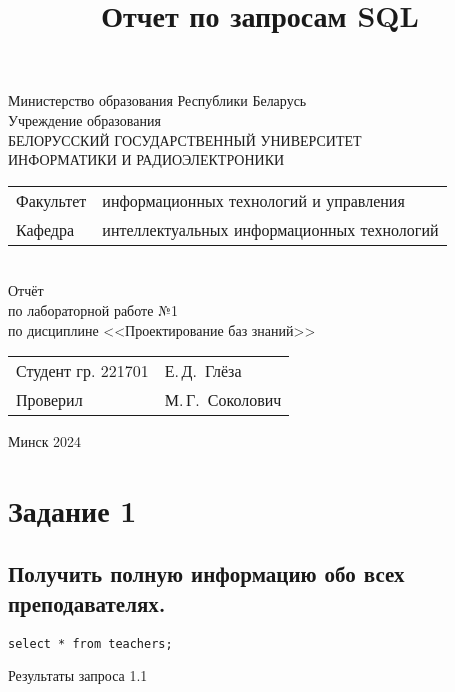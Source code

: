 \documentclass[a4paper,8pt]{article}
\title{Отчет по запросам SQL}
\author{}
\date{}
\begin{document}
\begin{titlepage}
  \begin{center}
    Министерство образования Республики Беларусь\\[1em]
    Учреждение образования\\
    БЕЛОРУССКИЙ ГОСУДАРСТВЕННЫЙ УНИВЕРСИТЕТ \\
    ИНФОРМАТИКИ И РАДИОЭЛЕКТРОНИКИ\\[8em]

    \begin{minipage}{\textwidth}
      \begin{flushleft}
        \begin{tabular}{ l l }
          Факультет & информационных технологий и управления\\
          Кафедра   & интеллектуальных информационных технологий
        \end{tabular}
      \end{flushleft}
    \end{minipage}\\[8em]

    {Отчёт}\\
    {по лабораторной работе №1}\\
    {по дисциплине <<Проектирование баз знаний>>}\\[8em]

    \vspace{2em}
    \begin{tabular}{ p{}p{} }
      Студент гр. 221701 & Е.\,Д.~Глёза \\
      Проверил & М.\,Г.~Соколович \\
    \end{tabular}
    
    \vfill
    {\normalsize Минск 2024}
  \end{center}
\end{titlepage}

\section{Задание 1}

\subsection{Получить полную информацию обо всех преподавателях.}
\begin{verbatim}
select * from teachers;
\end{verbatim}
\begin{table}[H]
\centering

\caption{Результаты запроса 1.1}
\end{table}
\end{document}
